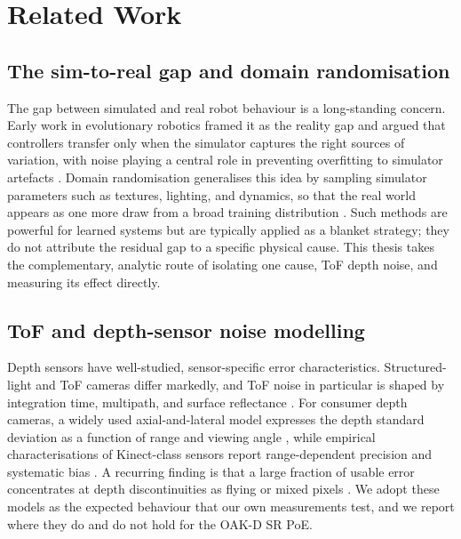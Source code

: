\section{Related Work}\label{sec:related}
\subsection{The sim-to-real gap and domain randomisation}
The gap between simulated and real robot behaviour is a long-standing concern. Early work
in evolutionary robotics framed it as the reality gap and argued that controllers
transfer only when the simulator captures the right sources of variation, with noise
playing a central role in preventing overfitting to simulator artefacts
\cite{jakobi1995noise}. Domain randomisation generalises this idea by sampling simulator
parameters such as textures, lighting, and dynamics, so that the real world appears as
one more draw from a broad training distribution \cite{tobin2017domain}. Such methods are
powerful for learned systems but are typically applied as a blanket strategy; they do not
attribute the residual gap to a specific physical cause. This thesis takes the
complementary, analytic route of isolating one cause, ToF depth noise, and measuring its
effect directly.

\subsection{ToF and depth-sensor noise modelling}
Depth sensors have well-studied, sensor-specific error characteristics. Structured-light
and ToF cameras differ markedly, and ToF noise in particular is shaped by integration
time, multipath, and surface reflectance \cite{sarbolandi2015kinect,foix2011lockin}. For
consumer depth cameras, a widely used axial-and-lateral model expresses the depth
standard deviation as a function of range and viewing angle \cite{nguyen2012modeling},
while empirical characterisations of Kinect-class sensors report range-dependent
precision and systematic bias \cite{khoshelham2012accuracy}. A recurring finding is that
a large fraction of usable error concentrates at depth discontinuities as flying or mixed
pixels \cite{foix2011lockin,sarbolandi2015kinect}. We adopt these models as the expected
behaviour that our own measurements test, and we report where they do and do not hold for
the OAK-D SR PoE.

